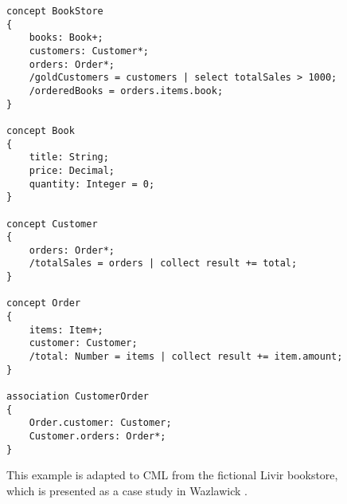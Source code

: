 \begin{figure}
\begin{verbatim}
concept BookStore
{
    books: Book+;
    customers: Customer*;
    orders: Order*;
    /goldCustomers = customers | select totalSales > 1000;
    /orderedBooks = orders.items.book;
}

concept Book
{
    title: String;
    price: Decimal;
    quantity: Integer = 0;
}

concept Customer
{
    orders: Order*;
    /totalSales = orders | collect result += total;
}

concept Order
{
    items: Item+;
    customer: Customer;
    /total: Number = items | collect result += item.amount;
}

association CustomerOrder
{
    Order.customer: Customer;
    Customer.orders: Order*;
}
\end{verbatim}
\caption{This example is adapted to CML from the fictional Livir bookstore, which is presented as a case study in Wazlawick \cite{wazlawick}.}
\end{figure}
